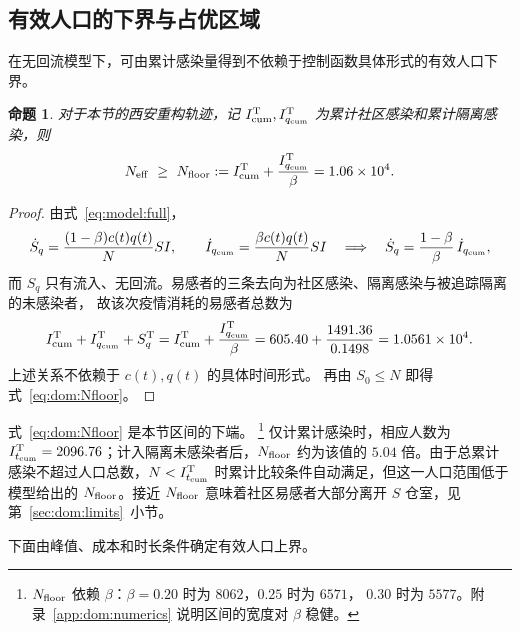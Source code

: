\documentclass[UTF8,a4paper,10pt,fontset=fandol]{ctexart}
\theoremstyle{cnplain}
\newtheorem{proposition}[theorem]{命题}
\theoremstyle{remark}
\newcommand{\Itcum}{I_{t_{\mathrm{cum}}}}
\numberwithin{equation}{section}
\begin{document}
\subsection{有效人口的下界与占优区域}
\label{sec:dom:region}

在无回流模型下，可由累计感染量得到不依赖于控制函数具体形式的有效人口下界。

\begin{proposition}\label{prop:dom:floor}
对于本节的西安重构轨迹，记 $I_{\rm cum}^{\rm T},I_{q_{\rm cum}}^{\rm T}$ 为累计社区感染和累计隔离感染，则
\begin{equation}
  N_{\rm eff}\ \ge\ N_{\rm floor}
  :=I_{\rm cum}^{\rm T}+\frac{I_{q_{\rm cum}}^{\rm T}}{\beta}
  =1.06\times10^{4}.
  \label{eq:dom:Nfloor}
\end{equation}
\end{proposition}
\begin{proof}
由式~\eqref{eq:model:full}，
\[
  \dot S_q=\frac{(1-\beta)c(t)q(t)}{N}SI,
  \qquad
  \dot I_{q_{\rm cum}}=\frac{\beta c(t)q(t)}{N}SI
  \quad\Longrightarrow\quad
  \dot S_q=\frac{1-\beta}{\beta}\,\dot I_{q_{\rm cum}},
\]
而 $S_q$ 只有流入、无回流。易感者的三条去向为社区感染、隔离感染与被追踪隔离的未感染者，
故该次疫情消耗的易感者总数为
\begin{equation}
  I_{\rm cum}^{\rm T}+I_{q_{\rm cum}}^{\rm T}+S_q^{\rm T}
  =I_{\rm cum}^{\rm T}+\frac{I_{q_{\rm cum}}^{\rm T}}{\beta}
  =605.40+\frac{1491.36}{0.1498}
  =1.0561\times10^{4}.
  \label{eq:dom:Sconsumed}
\end{equation}
上述关系不依赖于 $c(t),q(t)$ 的具体时间形式。
再由 $S_0\le N$ 即得式~\eqref{eq:dom:Nfloor}。
\end{proof}

式~\eqref{eq:dom:Nfloor} 是本节区间的下端。%
\footnote{$N_{\rm floor}$ 依赖 $\beta$：$\beta=0.20$ 时为 $8062$，$0.25$ 时为 $6571$，
$0.30$ 时为 $5577$。附录~\ref{app:dom:numerics} 说明区间的宽度对 $\beta$ 稳健。}
仅计累计感染时，相应人数为 $\Itcum^{\rm T}=2096.76$；计入隔离未感染者后，$N_{\rm floor}$ 约为该值的 $5.04$ 倍。由于总累计感染不超过人口总数，$N<\Itcum^{\rm T}$ 时累计比较条件自动满足，但这一人口范围低于模型给出的 $N_{\rm floor}$。接近 $N_{\rm floor}$ 意味着社区易感者大部分离开 $S$ 仓室，见第~\ref{sec:dom:limits}~小节。

下面由峰值、成本和时长条件确定有效人口上界。
\end{document}
